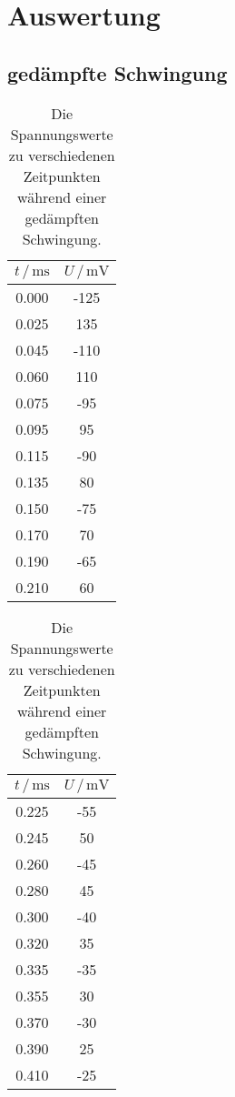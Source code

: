 \section{Auswertung}
\label{sec:Auswertung}

\subsection{gedämpfte Schwingung}

\begin{table}
\centering
\caption{Die Spannungswerte zu verschiedenen Zeitpunkten während einer gedämpften Schwingung.}
\begin{tabular}[t]{cc}
    \toprule
    $t \, / \, \si{\milli\s}$ & $U \,/\, \si{\milli\V}$ \\
    \midrule
    0.000&-125\\
    0.025&135\\
    0.045&-110\\    
    0.060&110\\
    0.075&-95\\
    0.095&95\\
    0.115&-90\\
    0.135&80\\
    0.150&-75\\
    0.170&70\\
    0.190&-65\\
    0.210&60\\
\end{tabular}
\begin{tabular}[t]{cc}
    \toprule
    $t \, / \, \si{\milli\s}$ & $U \,/\, \si{\milli\V}$ \\
    \midrule
    0.225&-55\\
    0.245&50\\
    0.260&-45\\
    0.280&45\\
    0.300&-40\\
    0.320&35\\
    0.335&-35\\
    0.355&30\\
    0.370&-30\\
    0.390&25\\
    0.410&-25\\
    \bottomrule
\end{tabular}
\label{tab:gedaempft}
\end{table}

